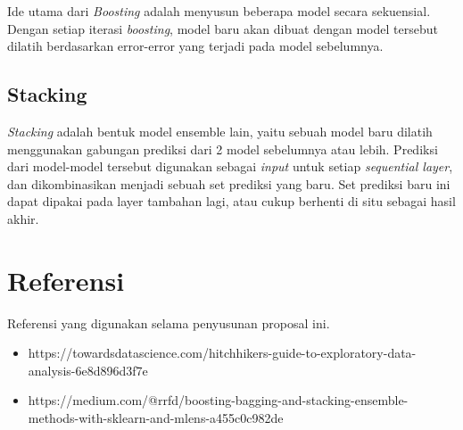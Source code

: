 \documentclass{article}
\begin{document}
\begin{normalsize}
        Ide utama dari \textit{Boosting} adalah menyusun beberapa model secara sekuensial. Dengan setiap iterasi 
        \textit{boosting}, model baru akan dibuat dengan model tersebut dilatih berdasarkan error-error yang terjadi
        pada model sebelumnya.

        \subsection{Stacking}

        \textit{Stacking} adalah bentuk model ensemble lain, yaitu sebuah model baru dilatih menggunakan gabungan prediksi
        dari 2 model sebelumnya atau lebih. Prediksi dari model-model tersebut digunakan sebagai \textit{input} untuk 
        setiap \textit{sequential layer}, dan dikombinasikan menjadi sebuah set prediksi yang baru. Set prediksi baru ini 
        dapat dipakai pada layer tambahan lagi, atau cukup berhenti di situ sebagai hasil akhir.

        \section{Referensi}

        Referensi yang digunakan selama penyusunan proposal ini.
        \begin{itemize}
            \item https://towardsdatascience.com/hitchhikers-guide-to-exploratory-data-analysis-6e8d896d3f7e
            \item https://medium.com/@rrfd/boosting-bagging-and-stacking-ensemble-methods-with-sklearn-and-mlens-a455c0c982de
        \end{itemize}
    \end{normalsize}
  
\end{document}
